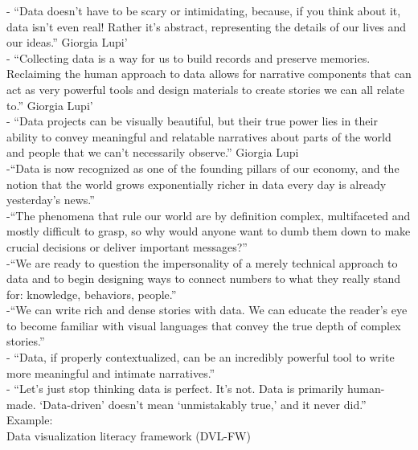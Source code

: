 -{\color{orange} “Data doesn’t have to be scary or intimidating, because, if you think about it, data isn’t even real! Rather it’s abstract, representing the details of our lives and our ideas.” Giorgia Lupi'\cite{storiesGL}}\\
-{\color{orange} “Collecting data is a way for us to build records and preserve memories. Reclaiming the human approach to data allows for narrative components that can act as very powerful tools and design materials to create stories we can all relate to.” Giorgia Lupi' \cite{storiesGL}}\\
-{\color{orange} “Data projects can be visually beautiful, but their true power lies in their ability to convey meaningful and relatable narratives about parts of the world and people that we can’t necessarily observe.” Giorgia Lupi\cite{storiesGL}}\\
-{\color{orange}“Data is now recognized as one of the founding pillars of our economy, and the notion that the world grows exponentially richer in data every day is already yesterday’s news.”\cite{Lupi2017}}\\
-{\color{orange}“The phenomena that rule our world are by definition complex, multifaceted and mostly difficult to grasp, so why would anyone want to dumb them down to make crucial decisions or deliver important messages?”\cite{Lupi2017}}\\
-{\color{orange}“We are ready to question the impersonality of a merely technical approach to data and to begin designing ways to connect numbers to what they really stand for: knowledge, behaviors, people.”\cite{Lupi2017}}\\
-{\color{orange}“We can write rich and dense stories with data. We can educate the reader’s eye to become familiar with visual languages that convey the true depth of complex stories.”\cite{Lupi2017}}\\
-{\color{orange} “Data, if properly contextualized, can be an incredibly powerful tool to write more meaningful and intimate narratives.”\cite{Lupi2017}}\\
-{\color{orange} “Let’s just stop thinking data is perfect. It’s not. Data is primarily human-made. ‘Data-driven’ doesn’t mean ‘unmistakably true,’ and it never did.”\cite{Lupi2017}}\\

Example:\\
Data visualization literacy framework (DVL-FW)


